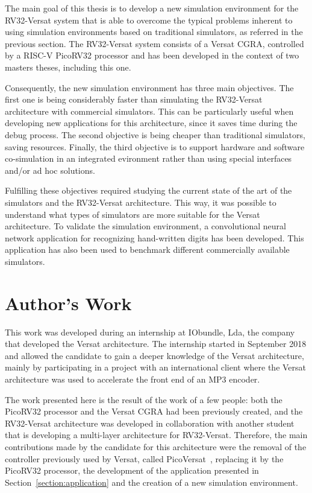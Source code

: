 The main goal of this thesis is to develop a new simulation environment for the
RV32-Versat system that is able to overcome the typical problems inherent to
using simulation environments based on traditional simulators, as referred in
the previous section. The RV32-Versat system consists of a Versat \ac{CGRA},
controlled by a RISC-V PicoRV32 processor and has been developed in the context
of two masters theses, including this one.

Consequently, the new simulation environment has three main objectives. The
first one is being considerably faster than simulating the RV32-Versat
architecture with commercial simulators. This can be particularly useful when
developing new applications for this architecture, since it saves time during
the debug process. The second objective is being cheaper than traditional
simulators, saving resources. Finally, the third objective is to support
hardware and software co-simulation in an integrated evironment rather than
using special interfaces and/or ad hoc solutions.

Fulfilling these objectives required studying the current state of the art of
the simulators and the RV32-Versat architecture. This way, it was possible to
understand what types of simulators are more suitable for the Versat
architecture. To validate the simulation environment, a convolutional neural
network application for recognizing hand-written digits has been developed.
This application has also been used to benchmark different commercially
available simulators.


\section{Author's Work}
\label{section:work}

This work was developed during an internship at IObundle, Lda, the
company that developed the Versat architecture. The internship started in
September 2018 and allowed the candidate to gain a deeper knowledge of the
Versat architecture, mainly by participating in a project with an
international client where the Versat architecture was used to accelerate
the front end of an MP3 encoder.

The work presented here is the result of the work of a few people: both the
PicoRV32 processor and the Versat \ac{CGRA} had been previously created, and the
RV32-Versat architecture was developed in collaboration with another student
that is developing a multi-layer architecture for RV32-Versat. Therefore, the main 
contributions made by the candidate for this architecture were the removal of the 
controller previously used by Versat, called PicoVersat~\cite{picoversat}, replacing it 
by the PicoRV32 processor, the development of the application presented in 
Section~\ref{section:application} and the creation of a new simulation environment.


